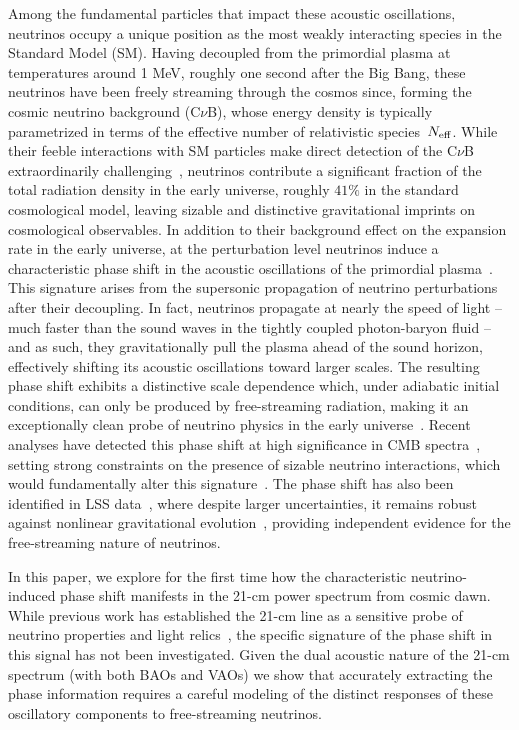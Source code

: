 Among the fundamental particles that impact these acoustic oscillations, neutrinos occupy a unique position as the most weakly interacting species in the Standard Model (SM).  Having decoupled from the primordial plasma at temperatures around 1 MeV, roughly one second after the Big Bang, these neutrinos have been freely streaming through the cosmos since, forming the cosmic neutrino background (C$\nu$B), whose energy density is typically parametrized in terms of the effective number of relativistic species~$N_{\rm eff}$. While their feeble interactions with SM particles make direct detection of the C$\nu$B extraordinarily challenging~\cite{Bauer:2022lri,PTOLEMY:2019hkd}, neutrinos contribute a significant fraction of the total radiation density in the early universe, roughly $41\%$ in the standard cosmological model,  leaving sizable and distinctive gravitational imprints on cosmological observables. In addition to their background effect on the expansion rate in the early universe, at the perturbation level neutrinos induce a characteristic phase shift in the acoustic oscillations of the primordial plasma~\citep{Bashinsky:2003tk}. This signature arises from the supersonic propagation of neutrino perturbations after their decoupling. In fact, neutrinos propagate  at nearly the speed of light -- much faster than the sound waves in the tightly coupled photon-baryon fluid -- and as such, they gravitationally pull the plasma ahead of the sound horizon, effectively shifting its acoustic oscillations toward larger scales. The resulting phase shift exhibits a distinctive scale dependence which, under adiabatic initial conditions, can only be produced by free-streaming radiation, making it an exceptionally clean probe of neutrino physics in the early universe~\citep{Baumann:2015rya}. Recent analyses have detected this phase shift at high significance in CMB spectra~\citep{Follin:2015hya,Baumann:2015rya,Montefalcone:2025unv,montefalcone25}, setting strong constraints on the presence of sizable neutrino interactions, which would fundamentally alter this signature~\citep{Choi:2018gho,montefalcone25}. The phase shift has also been identified in LSS data~\citep{Baumann:2017gkg,Baumann:2019keh}, where despite larger uncertainties, it remains robust against nonlinear gravitational evolution~\citep{Baumann:2017lmt}, providing independent evidence for the free-streaming nature of neutrinos.


In this paper, we explore for the first time how the characteristic neutrino-induced phase shift manifests in the 21-cm power spectrum from cosmic dawn. While previous work has established the 21-cm line as a sensitive probe of neutrino properties and light relics~\citep{Lee:2023uxu,Dey:2022ini,Plombat:2024kla,Dhuria:2024zwh,Libanore:2025ack}, the specific signature of the phase shift in this signal has not been investigated. Given the dual acoustic nature of the 21-cm spectrum (with both BAOs and VAOs) we show that accurately extracting the phase information requires a careful modeling of the distinct responses of these oscillatory components to free-streaming neutrinos.

